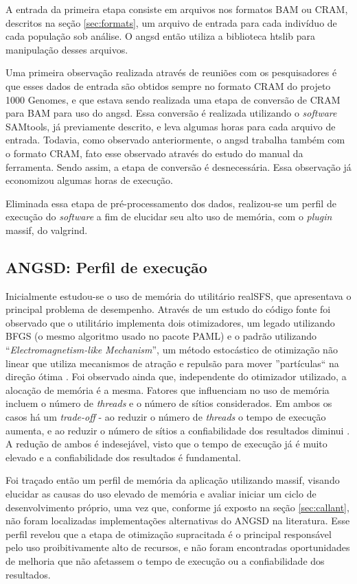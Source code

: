 \documentclass[cic,tc]{iiufrgs}
\begin{document}
A entrada da primeira etapa consiste em arquivos nos formatos BAM ou CRAM,
descritos na seção \ref{sec:formats}, um arquivo de entrada para cada indivíduo
de cada população sob análise. O angsd então utiliza a biblioteca
htslib para manipulação desses arquivos.

Uma primeira observação realizada através de reuniões com os pesquisadores é
que esses dados de entrada são obtidos sempre no formato CRAM do projeto 1000
Genomes, e que estava sendo realizada uma etapa de conversão de CRAM para BAM
para uso do angsd. Essa conversão é realizada utilizando o \textit{software}
SAMtools, já previamente descrito, e leva algumas horas para cada arquivo de
entrada. Todavia, como observado anteriormente, o angsd trabalha também com o
formato CRAM, fato esse observado através do estudo do manual da ferramenta.
Sendo assim, a etapa de conversão é desnecessária. Essa observação já
economizou algumas horas de execução.

Eliminada essa etapa de pré-processamento dos dados, realizou-se um perfil de
execução do \textit{software} a fim de elucidar seu alto uso de memória, com o
\textit{plugin} massif, do valgrind.

\subsection{ANGSD: Perfil de execução}

Inicialmente estudou-se o uso de memória do utilitário realSFS, que apresentava o
principal problema de desempenho. Através de um estudo do código fonte foi
observado que o utilitário implementa dois otimizadores, um legado utilizando
BFGS (o mesmo algoritmo usado no pacote PAML) e o padrão utilizando
``\textit{Electromagnetism-like Mechanism}'', um método estocástico de otimização
não linear que utiliza mecanismos de atração e repulsão para mover
''partículas`` na direção ótima \cite{5636954}. Foi observado ainda que,
independente do otimizador utilizado, a alocação de memória é a mesma. Fatores
que influenciam no uso de memória incluem o número de \textit{threads} e o número de
sítios considerados. Em ambos os casos há um \textit{trade-off} - ao reduzir o
número de \textit{threads} o tempo de execução aumenta, e ao reduzir o número de sítios
a confiabilidade dos resultados diminui \cite{popgen2016angsd}. A redução de
ambos é indesejável, visto que o tempo de execução já é muito elevado e a
confiabilidade dos resultados é fundamental.

Foi traçado então um perfil de memória da aplicação utilizando massif, visando
elucidar as causas do uso elevado de memória e avaliar iniciar um ciclo de
desenvolvimento próprio, uma vez que, conforme já exposto na seção
\ref{sec:callant}, não foram localizadas implementações alternativas do ANGSD
na literatura. Esse perfil revelou que a etapa de otimização supracitada é o
principal responsável pelo uso proibitivamente alto de recursos, e não foram
encontradas oportunidades de melhoria que não afetassem o tempo de execução ou
a confiabilidade dos resultados.
\end{document}
